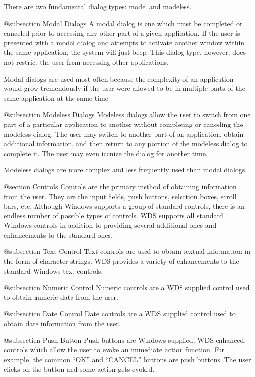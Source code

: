 There are two fundamental dialog types: model and modeless.

@subsection Modal Dialogs
A modal dialog is one which must be completed or canceled prior to
accessing any other part of a given application.  If the user is
presented with a modal dialog and attempts to activate another window
within the same application, the system will just beep.  This dialog
type, however, does not restrict the user from accessing other
applications.

Modal dialogs are used most often because the complexity of an application
would grow tremendously if the user were allowed to be in multiple parts
of the same application at the same time.

@subsection Modeless Dialogs
Modeless dialogs allow the user to switch from one part of a particular
application to another without completing or canceling the modeless dialog.
The user may switch to another part of an application, obtain additional
information, and then return to any portion of the modeless dialog to
complete it.  The user may even iconize the dialog for another time.

Modeless dialogs are more complex and less frequently used than modal
dialogs.

@section Controls
Controls are the primary method of obtaining information from the user.
They are the input fields, push buttons, selection boxes, scroll bars,
etc.  Although Windows supports a group of standard controls, there is
an endless number of possible types of controls.  WDS supports all
standard Windows controls in addition to providing several additional
ones and enhancements to the standard ones.

@subsection Text Control
Text controls are used to obtain textual information in the form
of character strings.  WDS provides a variety of enhancements to
the standard Windows text controls.


@subsection Numeric Control
Numeric controls are a WDS supplied control used to obtain numeric
data from the user.

@subsection Date Control
Date controls are a WDS supplied control used to obtain date information
from the user.

@subsection Push Button
Push buttons are Windows supplied, WDS enhanced, controls which allow
the user to evoke an immediate action function.  For example, the
common ``OK'' and ``CANCEL'' buttons are push buttons.  The user
clicks on the button and some action gets evoked.

